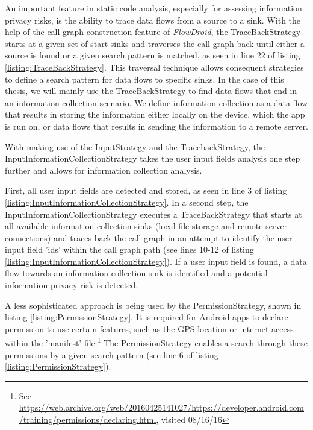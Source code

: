 An important feature in static code analysis, especially for assessing information privacy risks, is the ability to trace data flows from a source to a sink.
With the help of the call graph construction feature of \textit{FlowDroid}, the TraceBackStrategy starts at a given set of start-sinks and traverses the call graph back until either a source is found or a given search pattern is matched, as seen in line 22 of listing \ref{listing:TraceBackStrategy}.
This traversal technique allows consequent strategies to define a search pattern for data flows to specific sinks.
In the case of this thesis, we will mainly use the TraceBackStrategy to find data flows that end in an information collection scenario. 
We define information collection as a data flow that results in storing the information either locally on the device, which the app is run on, or data flows that results in sending the information to a remote server.


With making use of the InputStrategy and the TracebackStrategy, the InputInformationCollectionStrategy takes the user input fields analysis one step further and allows for information collection analysis.

First, all user input fields are detected and stored, as seen in line 3 of listing \ref{listing:InputInformationCollectionStrategy}. 
In a second step, the InputInformationCollectionStrategy executes a TraceBackStrategy that starts at all available information collection sinks (local file storage and remote server connections) and traces back the call graph in an attempt to identify the user input field 'ids' within the call graph path (see lines 10-12 of listing \ref{listing:InputInformationCollectionStrategy}).
If a user input field is found, a data flow towards an information collection sink is identified and a potential information privacy risk is detected.

A less sophisticated approach is being used by the PermissionStrategy, shown in listing \ref{listing:PermissionStrategy}.
It is required for Android apps to declare permission to use certain features, such as the \acs{GPS} location or internet access within the 'manifest' file.\footnote{\raggedright See \url{https://web.archive.org/web/20160425141027/https://developer.android.com/training/permissions/declaring.html}, visited 08/16/16}
The PermissionStrategy enables a search through these permissions by a given search pattern (see line 6 of listing \ref{listing:PermissionStrategy}).


